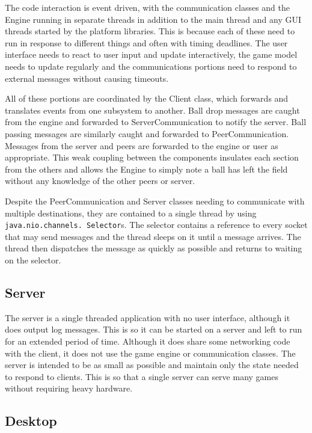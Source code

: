 \documentclass{sig-alternate}
\begin{document}
The code interaction is event driven, with the communication classes and
the Engine running in separate threads in addition to the main thread and
any GUI threads started by the platform libraries.  This is because each of
these need to run in response to different things and often with timing
deadlines.  The user interface needs to react to user input and update
interactively, the game model needs to update regularly and the
communications portions need to respond to external messages without
causing timeouts.

All of these portions are coordinated by the Client class, which forwards
and translates events from one subsystem to another.  Ball drop messages
are caught from the engine and forwarded to ServerCommunication to notify
the server.  Ball passing messages are similarly caught and forwarded to
PeerCommunication.  Messages from the server and peers are forwarded to the
engine or user as appropriate.  This weak coupling between the components
insulates each section from the others and allows the Engine to simply note
a ball has left the field without any knowledge of the other peers or
server.

Despite the PeerCommunication and Server classes needing to communicate
with multiple destinations, they are contained to a single thread by using
\texttt{java.nio.channels. Selector}s.  The selector contains a reference to
every socket that may send messages and the thread sleeps on it until a
message arrives.  The thread then dispatches the message as quickly as
possible and returns to waiting on the selector.

\subsection{Server}

The server is a single threaded application with no user interface,
although it does output log messages.  This is so it can be started on a
server and left to run for an extended period of time.  Although it does
share some networking code with the client, it does not use the game engine
or communication classes.  The server is intended to be as small as
possible and maintain only the state needed to respond to clients.  This is
so that a single server can serve many games without requiring heavy
hardware.

\subsection{Desktop}
\end{document}
